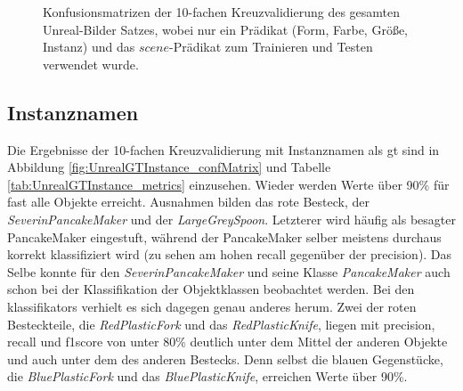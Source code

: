 \begin{figure}
\begin{subfigure}[b]{0.48\textwidth}
	\end{subfigure}
\caption[Konfusionsmatrizen für die Klassifikation mit nur einem Annotatoren Prädikat]{Konfusionsmatrizen der 10-fachen Kreuzvalidierung des gesamten Unreal-Bilder Satzes, wobei nur ein \robosherlock Prädikat (Form, Farbe, Größe, Instanz) und das $scene$-Prädikat zum Trainieren und Testen verwendet wurde.}
\label{fig:singleEvidences}
\end{figure}

\subsection{Instanznamen}

Die Ergebnisse der 10-fachen Kreuzvalidierung mit Instanznamen als \gls{gt} sind in Abbildung \ref{fig:UnrealGTInstance_confMatrix} und Tabelle \ref{tab:UnrealGTInstance_metrics} einzusehen. Wieder werden Werte über 90\% für fast alle Objekte erreicht. Ausnahmen bilden das rote Besteck, der \textit{SeverinPancakeMaker} und der \textit{LargeGreySpoon}. Letzterer wird häufig als besagter PancakeMaker eingestuft, während der PancakeMaker selber meistens durchaus korrekt klassifiziert wird (zu sehen am hohen \gls{recall} gegenüber der \gls{precision}). Das Selbe konnte für den \textit{SeverinPancakeMaker} und seine Klasse \textit{PancakeMaker} auch schon bei der Klassifikation der Objektklassen beobachtet werden. Bei den \glspl{klassifikator} verhielt es sich dagegen genau anderes herum. Zwei der roten Besteckteile, die \textit{RedPlasticFork} und das \textit{RedPlasticKnife}, liegen mit \gls{precision}, \gls{recall} und \gls{f1score} von unter 80\% deutlich unter dem Mittel der anderen Objekte und auch unter dem des anderen Bestecks. Denn selbst die blauen Gegenstücke, die \textit{BluePlasticFork} und das \textit{BluePlasticKnife}, erreichen Werte über 90\%.

